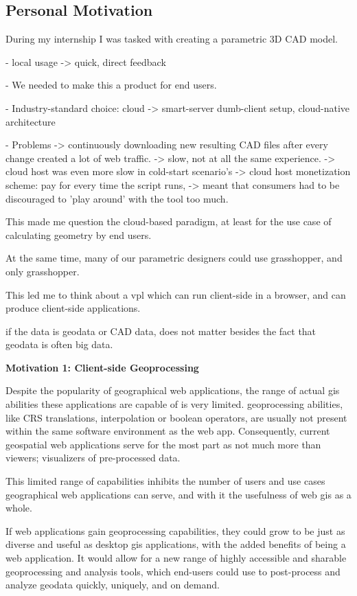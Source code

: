   \subsection{Personal Motivation}
  During my internship I was tasked with creating a parametric 3D CAD model. 
  
  - local usage 
    -> quick, direct feedback
  
  - We needed to make this a product for end users. 
  
  - Industry-standard choice: cloud 
    -> smart-server dumb-client setup, cloud-native architecture 
  
  - Problems
    -> continuously downloading new resulting CAD files after every change created a lot of web traffic. 
    -> slow, not at all the same experience.
    -> cloud host was even more slow in cold-start scenario's   
    -> cloud host monetization scheme: pay for every time the script runs, 
       -> meant that consumers had to be discouraged to 'play around' with the tool too much. 
    
  This made me question the cloud-based paradigm, at least for the use case of calculating geometry by end users. 
  
  At the same time, many of our parametric designers could use grasshopper, and only grasshopper. 
  
  This led me to think about a vpl which can run client-side in a browser, and can produce client-side applications.
  
  if the data is geodata or CAD data, does not matter besides the fact that geodata is often big data.
  
  \textbf{Motivation 1: Client-side Geoprocessing}
  
  Despite the popularity of geographical web applications, the range of actual \ac{gis} abilities these applications are capable of is very limited. \ac{geoprocessing} abilities, like CRS translations, interpolation or boolean operators, are usually not present within the same software environment as the web app. Consequently, current geospatial web applications serve for the most part as not much more than viewers; visualizers of pre-processed data. 
  
  This limited range of capabilities inhibits the number of users and use cases geographical web applications can serve, and with it the usefulness of web \ac{gis} as a whole. 
  
  If web applications gain \ac{geoprocessing} capabilities, they could grow to be just as diverse and useful as desktop \ac{gis} applications, with the added benefits of being a web application. It would allow for a new range of highly accessible and sharable geoprocessing and analysis tools, which end-users could use to post-process and analyze geodata quickly, uniquely, and on demand.
  
